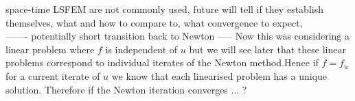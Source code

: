 \documentclass[../draft_1.tex]{subfiles}
\begin{document}
space-time LSFEM are not commonly used, future will tell if they establish themselves, what and how to compare to, what convergence to expect, \\

------- potentially short transition back to Newton ----- 
Now this was considering a linear problem where $f$ is independent of $u$ but we will see later that these linear problems correspond to individual iterates of the Newton method.Hence if $ f = f_u$ for a current iterate of $u$ we know that each linearised problem has a unique solution. Therefore if the Newton iteration converges ... ?
\end{document}
